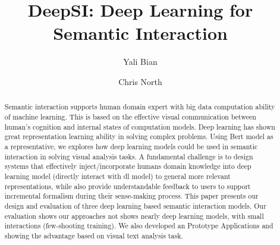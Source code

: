 \documentclass[manuscript,screen]{acmart}
\begin{document}
\title{DeepSI: Deep Learning for Semantic Interaction}

\author{Yali Bian}

\author{Chris North}


\renewcommand{\shortauthors}{Yali and Chris, et al.}

\begin{abstract}
Semantic interaction supports human domain expert with big data computation ability of machine learning.  
This is based on the effective visual communication between human's cognition and internal states of computation models.
Deep learning has shown great representation learning ability in solving complex problems. 
Using Bert model as a representative, we explores how deep learning models could be used in semantic interaction in solving visual analysis tasks. 
A fundamental challenge is to design systems that effectively inject/incorporate humans domain knowledge into deep learning model (directly interact with dl model) to general more relevant representations, while also provide understandable feedback to users to support incremental formalism during their sense-making process. 
This paper presents our design and evaluation of three deep learning based semantic interaction models. 
Our evaluation shows our approaches not shows nearly deep learning models, with small interactions (few-shooting training). 
We also developed an Prototype Applications and showing the advantage based on visual text analysis task. 
\end{abstract}

\end{document}
